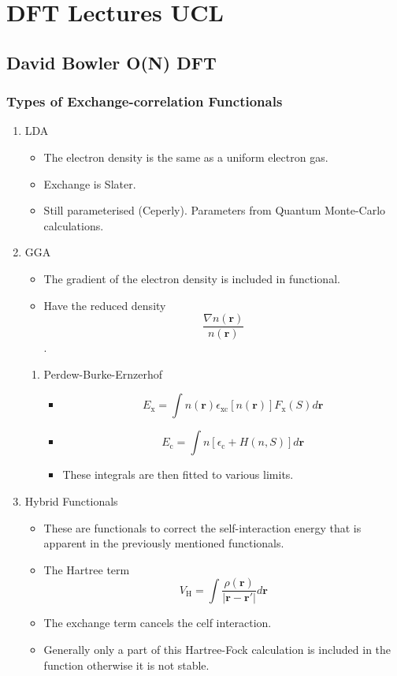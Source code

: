 \documentclass[11pt]{article}
\begin{document}
\section{DFT Lectures UCL}
\label{sec:org0adee81}
\subsection{David Bowler O(N) DFT}
\label{sec:org983c894}
\subsubsection{Types of Exchange-correlation Functionals}
\label{sec:org29c5783}

\begin{enumerate}
\item LDA
\label{sec:org2aa767f}
\begin{itemize}
\item The electron density is the same as a uniform electron gas.
\item Exchange is Slater.
\item Still parameterised (Ceperly). Parameters from Quantum Monte-Carlo
calculations.
\end{itemize}

\item GGA
\label{sec:org3c2f58e}
\begin{itemize}
\item The gradient of the electron density is included in functional.
\item Have the reduced density \[ \frac{ \nabla n(\mathbf{r})}{n( \mathbf{r}
       )}\].
\end{itemize}
\begin{enumerate}
\item Perdew-Burke-Ernzerhof
\label{sec:org69aa5fb}
\begin{itemize}
\item \[ E_{\text{x}} = \int n( \mathbf{r} ) \epsilon_{\text{xc}}[n( \mathbf{r}
        )] F_{\text{x}}(S)d\mathbf{r} \]
\item \[ E_{\text{c}} = \int n[ \epsilon_{\text{c}} + H(n,S) ]d\mathbf{r} \]
\item These integrals are then fitted to various limits.
\end{itemize}
\end{enumerate}

\item Hybrid Functionals
\label{sec:org8dce78a}
\begin{itemize}
\item These are functionals to correct the self-interaction energy that is
apparent in the previously mentioned functionals.
\item The Hartree term \[V_{\text{H}}=\int \frac{\rho(\mathbf{r})}{|\mathbf{r} - \mathbf{r}'|} d\mathbf{r}  \]
\item The exchange term cancels the celf interaction.
\item Generally only a part of this Hartree-Fock calculation is included in
the function otherwise it is not stable.
\end{itemize}






\end{enumerate}
\end{document}
